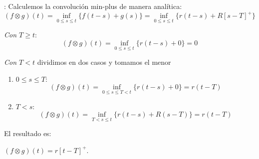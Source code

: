 \documentclass[xcolor={x11names}]{beamer}
\begin{document}
\begin{frame}{\secname: \subsecname}
    Calculemos la
    convolución min-plus
    de manera analítica:
    \begin{equation*}
        (f\otimes g)(t)
        =\inf_{0\leq s \leq t}
        \{f(t-s)+g(s)\}
        =\inf_{0\leq s \leq t}
        \{r(t-s)+R[s-T]^+\}
    \end{equation*}

    \pause

    \emph{Con $T\geq t$}:
    \begin{equation*}
        (f\otimes g)(t)
        =\inf_{0\leq s \leq t}
        \{r(t-s)+0\}=0
    \end{equation*}

    \pause

    \emph{Con $T< t$}
    dividimos en dos casos y
    tomamos el menor
        \pause
    \begin{enumerate}
        \item $0\leq s\leq T$:
        \begin{equation*}
            (f\otimes g)(t)
        =\inf_{0\leq s \leq T < t}
        \{r(t-s)+0\}=r(t-T)
        \end{equation*}
        \pause
    \item $T<s$:
        \begin{equation*}
            (f\otimes g)(t)
        =\inf_{T< s \leq t}
        \{r(t-s)+R(s-T)\}
        =r(t-T)
        \end{equation*}
    \end{enumerate}

    \pause
    El resultado es:
    \begin{mdframed}[rightmargin=20em]
        $(f\otimes g)(t)
        =r[t-T]^+$.
    \end{mdframed}

\end{frame}
\end{document}
